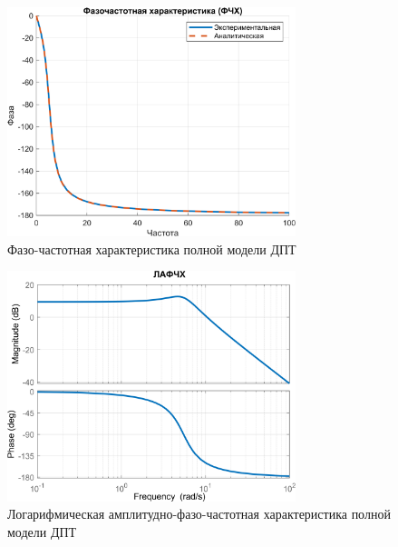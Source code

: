 \begin{figure}[H]
    \centering
    \includegraphics[width=0.75\textwidth, trim={0cm 0cm 0cm 0cm}]{../images/2_4.png}
    \caption{Фазо-частотная характеристика полной модели ДПТ}
\end{figure}

\begin{figure}[H]
    \centering
    \includegraphics[width=0.75\textwidth, trim={0cm 0cm 0cm 0cm}]{../images/2_5.png}
    \caption{Логарифмическая амплитудно-фазо-частотная характеристика полной модели ДПТ}
\end{figure}

\endinput